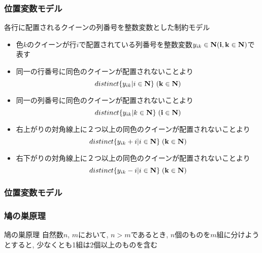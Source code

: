 \documentclass [dvipdfmx,12pt]{beamer}
\begin{document}
\begin{frame}
\frametitle{位置変数モデル}
{\small
各行に配置される\alert{クイーンの列番号}を整数変数とした制約モデル
}
{\footnotesize
\setlength{\abovedisplayskip}{1pt} %
\setlength{\belowdisplayskip}{0pt} %
\begin{block}{}
\setlength{\itemsep}{0pt}
\setlength{\parskip}{0pt}
\begin{itemize}
\item 色$k$のクイーンが行$i$で配置されている列番号を整数変数$y_{ik} \in \bf N (i, k \in \bf N)$で表す
\item 同一の\alert{行番号}に同色のクイーンが配置されないことより
$$distinct\{y_{ik} | i \in \bf N\} \; (k \in \bf N)$$
\item 同一の\alert{列番号}に同色のクイーンが配置されないことより
$$distinct\{y_{ik} | k \in \bf N\} \; (i \in \bf N)$$
\item \alert{右上がりの対角線上}に２つ以上の同色のクイーンが配置されないことより
$$distinct\{y_{ik}+i | i \in \bf N\} \; (k \in \bf N)$$
\item \alert{右下がりの対角線上}に２つ以上の同色のクイーンが配置されないことより
$$distinct\{y_{ik}-i | i \in \bf N\} \; (k \in \bf N)$$
\end{itemize}
\end{block}
}
\end{frame}



\begin{frame}
\frametitle{位置変数モデル}

\end{frame}



\begin{frame}
\frametitle{鳩の巣原理}
\begin{exampleblock}{鳩の巣原理}
自然数$n$, $m$において, $n>m$であるとき, $n$個のものを$m$組に分けようとすると, 少なくとも1組は2個以上のものを含む
\end{exampleblock}
\end{frame}
\end{document}
